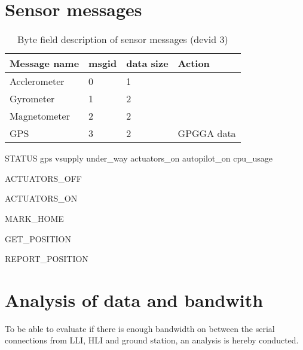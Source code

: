 \section{Sensor messages}
\begin{table}[h]
	\centering
	\begin{tabular}{llll}
		\toprule
		\textbf{Message name}  & \textbf{msgid} & \textbf{data size} & \textbf{Action}\\
		\midrule
		Acclerometer & 0 & 1 & \\
		Gyrometer & 1 & 2 & \\
		Magnetometer & 2 & 2 &  \\
		GPS & 3 & 2 & GPGGA data \\
		\bottomrule
	\end{tabular}
	\caption{Byte field description of sensor messages (devid 3)}
	\label{tab:ack}
\end{table}




STATUS
gps
vsupply
under\_way
actuators\_on
autopilot\_on
cpu\_usage

ACTUATORS\_OFF

ACTUATORS\_ON

MARK\_HOME

GET\_POSITION

REPORT\_POSITION


\section{Analysis of data and bandwith}
\label{sec:lli-bandwith}
To be able to evaluate if there is enough bandwidth on between the serial connections from LLI, HLI and ground station, an analysis is hereby conducted.

